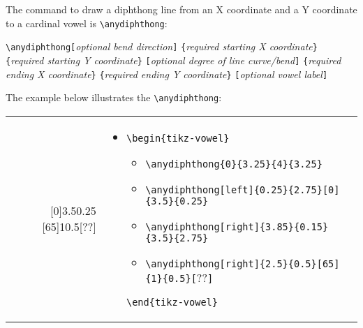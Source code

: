 \documentclass{article}
\def\\{}%
\def\charissil{}%
\begin{document}
The command to draw a diphthong line from an X coordinate and a Y coordinate to a cardinal vowel is \verb|\anydiphthong|:

\medskip
\qquad \verb+\anydiphthong[+\textit{optional bend direction}\verb+]+\\
\qquad\hspace*{11em} \verb+{+\textit{required starting X coordinate}\verb+}+\\
\qquad\hspace*{11em} \verb+{+\textit{required starting Y coordinate}\verb+}+\\
\qquad\hspace*{11em} \verb+[+\textit{optional degree of line curve/bend}\verb+]+\\
\qquad\hspace*{11em} \verb+{+\textit{required ending X coordinate}\verb+}+\\
\qquad\hspace*{11em} \verb+{+\textit{required ending Y coordinate}\verb+}+\\
\qquad\hspace*{11em} \verb+[+\textit{optional vowel label}\verb+]+\\
\bigskip

\noindent
The example below illustrates the \verb|\anydiphthong|:

\begin{center}
\begin{tabular}{rl}
  \begin{minipage}[t]{0.35\textwidth}
	{\large\charissil
		{\bfseries
		\begin{tikz-vowel}
			\anydiphthong{0}{3.25}{4}{3.25}
			\anydiphthong[left]{0.25}{2.75}[0]{3.5}{0.25}
			\anydiphthong[right]{3.85}{0.15}{3.5}{2.75}
			\anydiphthong[right]{2.5}{0.5}[65]{1}{0.5}[??]
		\end{tikz-vowel}
		}
	}
  \end{minipage} &
  \begin{minipage}[t]{0.44\textwidth}
  \vspace{-90pt}
  {\small
\begin{itemize}[label={}]
	\item \verb|\begin{tikz-vowel}|
		\begin{itemize}[label={}]
			\item \verb|\anydiphthong{0}{3.25}{4}{3.25}|
			\item \verb|\anydiphthong[left]{0.25}{2.75}[0]{3.5}{0.25}|
			\item \verb|\anydiphthong[right]{3.85}{0.15}{3.5}{2.75}|
			\item \verb|\anydiphthong[right]{2.5}{0.5}[65]{1}{0.5}[|{\charissil ??}\verb|]|
		\end{itemize}
	\verb|\end{tikz-vowel}|
\end{itemize}
    }
  \end{minipage}
\end{tabular}
\end{center}
\end{document}
